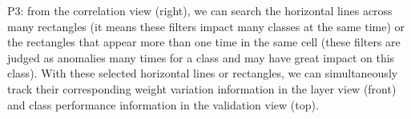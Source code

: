 \documentclass[format=acmsmall, review=false, screen=true]{acmart}
\newcommand{\ti}{\textcolor[rgb]{0,0,0}}
\newcommand{\dy}{\textcolor[rgb]{0,0,0}}
\begin{document}
{\begin{compactitem}
	\item P3: from the correlation view (right), we can search the horizontal lines across many rectangles (it means these filters impact many classes at the same time) or the rectangles that appear more than one time in the same cell (these filters are judged as anomalies many times for a class and may have great impact on this class). With these selected horizontal lines or rectangles, we can simultaneously track their corresponding weight variation information in the layer view (front) and class performance information in the validation view (top).
\end{compactitem}
}%
\end{document}
